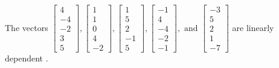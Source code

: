 \begin{exercise}
\begin{exerciseStatement}
  \end{exerciseStatement}
  \begin{exerciseAnswer}
   The vectors \(\left[\begin{array}{r}
4 \\
-4 \\
-2 \\
3 \\
5
\end{array}\right] , \left[\begin{array}{r}
1 \\
1 \\
0 \\
4 \\
-2
\end{array}\right] , \left[\begin{array}{r}
1 \\
5 \\
2 \\
-1 \\
5
\end{array}\right] , \left[\begin{array}{r}
-1 \\
4 \\
-4 \\
-2 \\
-1
\end{array}\right] , \text{ and } \left[\begin{array}{r}
-3 \\
5 \\
2 \\
1 \\
-7
\end{array}\right]\) are 
  	 linearly dependent  .
  


  \end{exerciseAnswer}
\end{exercise}